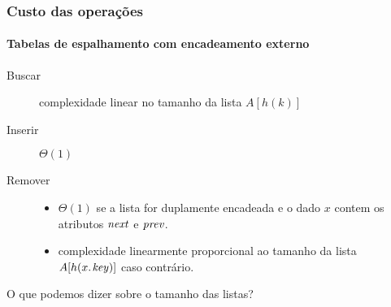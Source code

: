 \documentclass{beamer}
\begin{document}
\begin{frame}

  \frametitle{Custo das operações}
  \framesubtitle{Tabelas de espalhamento com encadeamento externo}

  \begin{description}

    \item[Buscar] complexidade linear no tamanho da lista $A[ h( k )]$


    \item[Inserir] $\Theta(1)$

    \item[Remover] 

      \begin{itemize}

        \item $\Theta(1)$ se a lista for duplamente encadeada e o dado $x$ contem os atributos
          $\id{next}$ e $\id{prev}$.

        \item complexidade linearmente proporcional ao tamanho da lista $A[ h(\attrib{x}{key}) ]$
          caso contrário.

      \end{itemize}

  \end{description}

  \pause 

  O que podemos dizer sobre o tamanho das listas?

\end{frame}
\end{document}
